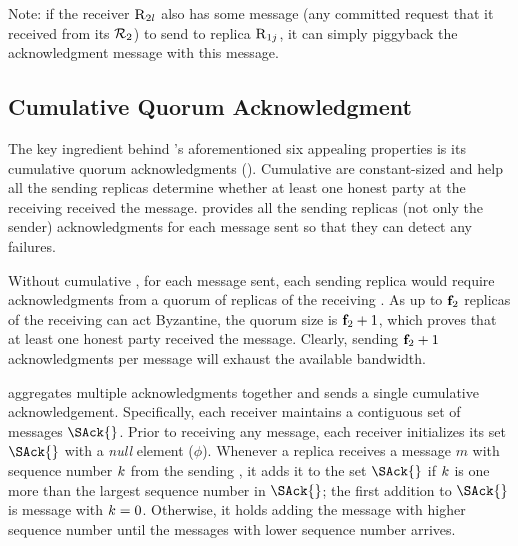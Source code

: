 Note: 
if the receiver $\textsc{R}_{{2}{l}}$ also has some message (any committed request that it 
received from its \RSM $\mathcal{R}_{2}$) 
to send to replica $\textsc{R}_{{1}{j}}$,
it can simply piggyback the acknowledgment message with this message.


\subsection{Cumulative Quorum Acknowledgment}
\label{ss:cum-quack}
The key ingredient behind \Scrooge's aforementioned six appealing properties is its 
cumulative quorum acknowledgments (\quack{}).
Cumulative  are constant-sized and help all the sending \RSM{}
replicas determine 
whether at least one honest party at the receiving \RSM{} received the message.
\Scrooge{} provides all the sending \RSM{} replicas (not only the sender)  
acknowledgments for each message sent so that they can detect any failures.

Without cumulative , for each message sent, each sending \RSM{} replica 
would require acknowledgments from a quorum of replicas of the receiving \RSM{}.
As up to $\textbf{f}_{2}$ replicas of the receiving \RSM{} can act Byzantine, the quorum size  
is $\textbf{f}_{2}+1$, which proves that at least one honest party received the message.
Clearly, sending $\textbf{f}_{2}+1$ acknowledgments per message will exhaust the available bandwidth.

\Scrooge{} aggregates multiple acknowledgments together and 
sends a single cumulative acknowledgement.
Specifically, each receiver maintains a contiguous set of messages $\SAck{}$.
Prior to receiving any message, each receiver initializes its set $\SAck{}$ with a {\em null} element ($\phi$).
Whenever a replica receives a message $m$ with sequence number $k$ from the sending \RSM{}, 
it adds it to the set $\SAck{}$
if $k$ is one more than the largest sequence number in $\SAck{}$; the first addition to $\SAck{}$ is message 
with $k = 0$.
Otherwise, it holds adding the message with higher sequence number until the messages with lower
sequence number arrives.

